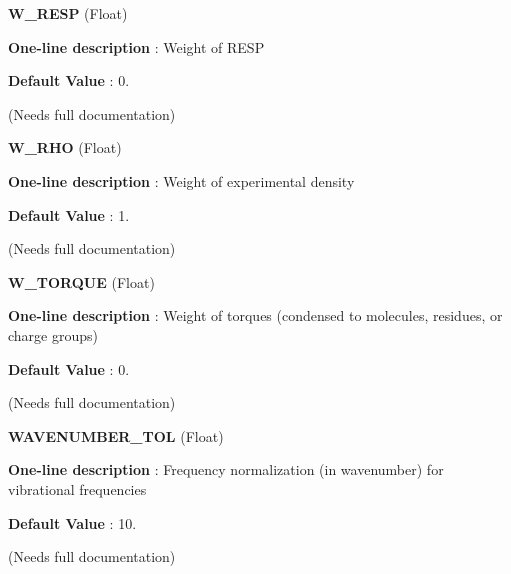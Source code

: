 \begin{DoxyItemize}
\item {\bfseries  W\-\_\-\-R\-E\-S\-P } (Float) \par
{\bfseries  One-\/line description }\-: Weight of R\-E\-S\-P \par
{\bfseries  Default Value }\-: 0. \par
(Needs full documentation)\end{DoxyItemize}
\begin{DoxyItemize}
\item {\bfseries  W\-\_\-\-R\-H\-O } (Float) \par
{\bfseries  One-\/line description }\-: Weight of experimental density \par
{\bfseries  Default Value }\-: 1. \par
(Needs full documentation)\end{DoxyItemize}
\begin{DoxyItemize}
\item {\bfseries  W\-\_\-\-T\-O\-R\-Q\-U\-E } (Float) \par
{\bfseries  One-\/line description }\-: Weight of torques (condensed to molecules, residues, or charge groups) \par
{\bfseries  Default Value }\-: 0. \par
(Needs full documentation)\end{DoxyItemize}
\begin{DoxyItemize}
\item {\bfseries  W\-A\-V\-E\-N\-U\-M\-B\-E\-R\-\_\-\-T\-O\-L } (Float) \par
{\bfseries  One-\/line description }\-: Frequency normalization (in wavenumber) for vibrational frequencies \par
{\bfseries  Default Value }\-: 10. \par
(Needs full documentation)\end{DoxyItemize}
